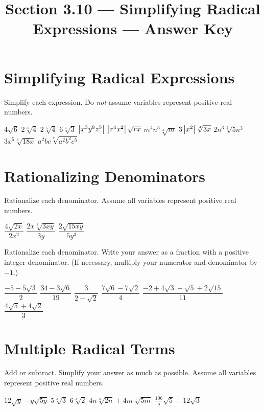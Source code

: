 

\title{Section 3.10 --- Simplifying Radical Expressions --- Answer Key}


\maketitle

\section*{Simplifying Radical Expressions}
Simplify each expression. Do \emph{not} assume variables represent positive real numbers.
\begin{smenum}
\mitemxxxx
{$4\sqrt{6}$}
{$2\sqrt[3]{4}$}
{$2\sqrt[5]{4}$}
{$6\sqrt[4]{3}$}
\mitemxxxx
{$\left|x^3y^8z^5\right|$}
{$\left|r^4x^2\right|\sqrt{rx}$}
{$m^4n^3\sqrt[3]{m}$}
{$3\left|x^2\right|\sqrt[4]{3x}$}
\mitemxxxo
{$2n^3\sqrt[5]{5n^3}$}
{$3x^5\sqrt[3]{18x}$}
{$a^2bc\sqrt[7]{a^2b^2c^5}$}
\end{smenum}

\section*{Rationalizing Denominators}
Rationalize each denominator. Assume all variables represent positive real numbers.
\begin{smenum}
\mitemxxx
{$\dfrac{4\sqrt{2x}}{2x^2}$}
{$\dfrac{2x\sqrt[3]{3xy}}{3y}$}
{$\dfrac{2\sqrt{15xy}}{5y^3}$}
\end{smenum}
Rationalize each denominator. Write your answer as a fraction with a positive integer denominator. (If necessary, multiply your numerator and denominator by $-1$.)
\begin{smenum}
\mitemxxx
{$\dfrac{-5-5\sqrt{3}}{2}$}
{$\dfrac{34-3\sqrt{6}}{19}$}
{$\dfrac{3}{2-\sqrt{2}}$}
\mitemxxx
{$\dfrac{7\sqrt{6}-7\sqrt{2}}{4}$}
{$\dfrac{-2+4\sqrt{3}-\sqrt{5}+2\sqrt{15}}{11}$}
{$\dfrac{4\sqrt{5}+4\sqrt{2}}{3}$}
\end{smenum}

\section*{Multiple Radical Terms}
Add or subtract.  Simplify your answer as much as possible. Assume all variables represent positive real numbers.
\begin{smenum}
\mitemxxxx
{$12\sqrt{y}$}
{$-y\sqrt{5y}$}
{$5\sqrt[3]{3}$}
{$6\sqrt[4]{2}$}
\mitemxx
{$4n\sqrt[3]{2n}+4m\sqrt[3]{5m}$}
{$\frac{106}{5}\sqrt{5}-12\sqrt{3}$}
\end{smenum}

